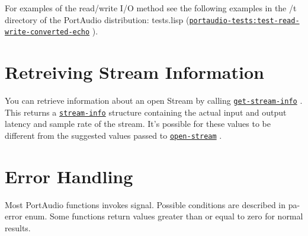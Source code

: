 \documentclass[a4paper]{report}
\begin{document}
For examples of the read/write I/O method see the following examples in the /t directory of the PortAudio distribution: tests.lisp (\hyperref[portaudio-tests__fun__test-read-write-converted-echo]{\texttt{portaudio-tests:test-read-write-converted-echo}}
  ).\section{Retreiving Stream Information} \label{d0d0e0e0e0e11}You can retrieve information about an open Stream by calling \hyperref[portaudio__fun__get-stream-info]{\texttt{get-stream-info}}
  . This returns a \hyperref[portaudio__class__stream-info]{\texttt{stream-info}}
   structure containing the actual input and output latency and sample rate of the stream. It's possible for these values to be different from the suggested values passed to \hyperref[portaudio__fun__open-stream]{\texttt{open-stream}}
  .\section{Error Handling} \label{d0d0e0e0e0e12}
Most PortAudio functions invokes signal. Possible conditions are described in pa-error enum. Some functions return values greater than or equal to zero for normal results.
\end{document}
